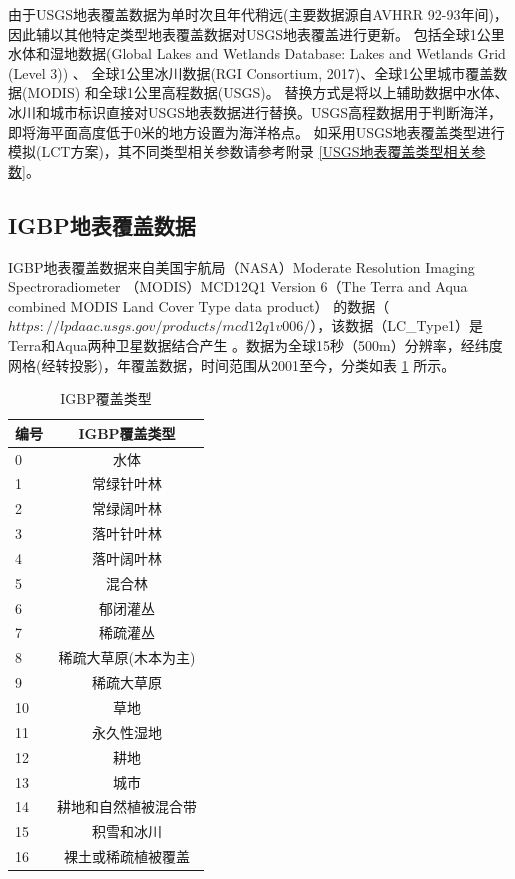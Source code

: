 由于USGS地表覆盖数据为单时次且年代稍远(主要数据源自AVHRR 92-93年间)，因此辅以其他特定类型地表覆盖数据对USGS地表覆盖进行更新。
包括全球1公里水体和湿地数据(Global Lakes and Wetlands Database: Lakes and Wetlands Grid (Level 3)) \citep{lehner2004development}、
全球1公里冰川数据(RGI Consortium, 2017)、全球1公里城市覆盖数据(MODIS) \citep{schneider2009new} 和全球1公里高程数据(USGS)。
替换方式是将以上辅助数据中水体、冰川和城市标识直接对USGS地表数据进行替换。USGS高程数据用于判断海洋，即将海平面高度低于0米的地方设置为海洋格点。
如采用USGS地表覆盖类型进行模拟(LCT方案)，其不同类型相关参数请参考附录 \ref{USGS地表覆盖类型相关参数}。

\subsection{IGBP地表覆盖数据}\label{IGBP地表覆盖数据}
IGBP地表覆盖数据来自美国宇航局（NASA）Moderate Resolution Imaging Spectroradiometer 
（MODIS）MCD12Q1 Version 6（The Terra and Aqua combined MODIS Land Cover Type data product）
的数据（$https://lpdaac.usgs.gov/products/mcd12q1v006/$），该数据（LC\_Type1）是Terra和Aqua两种卫星数据结合产生 
 \citep{Friedl2019}。数据为全球15秒（500m）分辨率，经纬度网格(经转投影)，年覆盖数据，时间范围从2001至今，分类如表 \ref{tab:IGBP覆盖类型} 所示。

\begin{table}[]
\centering
\caption{IGBP覆盖类型}
\label{tab:IGBP覆盖类型}
\begin{tabular}{@{}lc@{}}
\toprule
编号 & IGBP覆盖类型     \\ \midrule
0  & 水体           \\
1  & 常绿针叶林           \\
2  & 常绿阔叶林      \\
3  & 落叶针叶林     \\
4  & 落叶阔叶林 \\
5  & 混合林     \\
6  & 郁闭灌丛      \\
7  & 稀疏灌丛           \\
8  & 稀疏大草原(木本为主)         \\
9  & 稀疏大草原     \\
10 & 草地         \\
11 & 永久性湿地        \\
12 & 耕地        \\
13 & 城市        \\
14 & 耕地和自然植被混合带        \\
15 & 积雪和冰川        \\
16 & 裸土或稀疏植被覆盖       \\ \bottomrule
\end{tabular}
\end{table}


